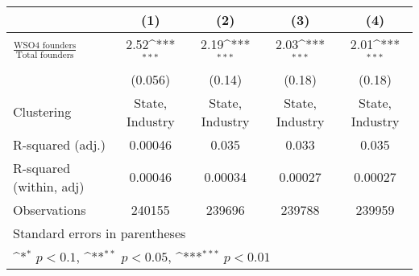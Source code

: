 {
\def\sym#1{\ifmmode^{#1}\else\(^{#1}\)\fi}
\begin{tabular}{l*{4}{c}}
\toprule
                    &\multicolumn{1}{c}{(1)}         &\multicolumn{1}{c}{(2)}         &\multicolumn{1}{c}{(3)}         &\multicolumn{1}{c}{(4)}         \\
\midrule
$\frac{\text{WSO4 founders}}{\text{Total founders}}$&        2.52\sym{***}&        2.19\sym{***}&        2.03\sym{***}&        2.01\sym{***}\\
                    &     (0.056)         &      (0.14)         &      (0.18)         &      (0.18)         \\
\midrule
Clustering          &State, Industry         &State, Industry         &State, Industry         &State, Industry         \\
R-squared (adj.)    &     0.00046         &       0.035         &       0.033         &       0.035         \\
R-squared (within, adj)&     0.00046         &     0.00034         &     0.00027         &     0.00027         \\
Observations        &      240155         &      239696         &      239788         &      239959         \\
\bottomrule
\multicolumn{5}{l}{\tiny Standard errors in parentheses}\\
\multicolumn{5}{l}{\tiny \sym{*} \(p<0.1\), \sym{**} \(p<0.05\), \sym{***} \(p<0.01\)}\\
\end{tabular}
}
